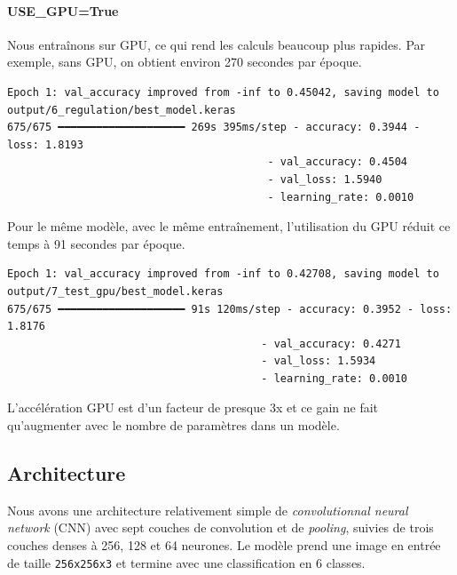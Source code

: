 \documentclass{article}
\begin{document}
\paragraph{USE\_GPU=True}

Nous entraînons sur GPU, ce qui rend les calculs beaucoup plus rapides. Par exemple, sans GPU, on obtient environ 270 secondes par époque.

\begin{verbatim}
Epoch 1: val_accuracy improved from -inf to 0.45042, saving model to output/6_regulation/best_model.keras
675/675 ━━━━━━━━━━━━━━━━━━━━ 269s 395ms/step - accuracy: 0.3944 - loss: 1.8193
                                         - val_accuracy: 0.4504
                                         - val_loss: 1.5940
                                         - learning_rate: 0.0010
\end{verbatim}

Pour le même modèle, avec le même entraînement, l’utilisation du GPU réduit ce temps à 91 secondes par époque.

\begin{verbatim}
Epoch 1: val_accuracy improved from -inf to 0.42708, saving model to output/7_test_gpu/best_model.keras
675/675 ━━━━━━━━━━━━━━━━━━━━ 91s 120ms/step - accuracy: 0.3952 - loss: 1.8176
                                        - val_accuracy: 0.4271
                                        - val_loss: 1.5934
                                        - learning_rate: 0.0010
\end{verbatim}

L’accélération GPU est d’un facteur de presque 3x et ce gain ne fait qu’augmenter avec le nombre de paramètres dans un modèle.

\subsection{ Architecture}

Nous avons une architecture relativement simple de \emph{convolutionnal neural network} (CNN) avec sept couches de convolution et de \emph{pooling}, suivies de trois couches denses à 256, 128 et 64 neurones. Le modèle prend une image en entrée de taille \texttt{256x256x3} et termine avec une classification en 6 classes.
\end{document}
